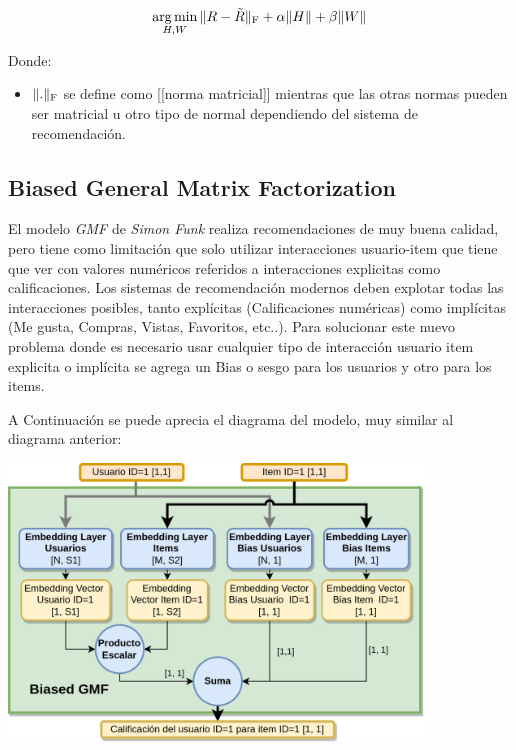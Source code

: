 \documentclass[11pt,a4paper,twoside]{thesis}
\begin{document}
\begin{equation*}
\underset{H, W}{\operatorname{arg\,min}}\, \|R - \tilde{R}\|_{\rm F} + \alpha\|H\| + \beta\|W\|
\end{equation*}
\begin{description}
\item[Donde:]
\end{description}
\begin{itemize}
\item $\|.\|_{\rm F}$ se define como [[norma matricial]] mientras que las otras normas pueden ser matricial u otro tipo de normal dependiendo del sistema de recomendación.
\end{itemize}

\subsection{Biased General Matrix Factorization}

El modelo \textit{GMF} de \textit{Simon Funk} realiza recomendaciones de muy buena calidad, pero tiene como limitación que solo utilizar interacciones usuario-item que tiene que ver con valores numéricos referidos a interacciones explicitas como calificaciones. Los sistemas de recomendación modernos deben explotar todas las interacciones posibles, tanto explícitas (Calificaciones numéricas) como implícitas (Me gusta, Compras, Vistas, Favoritos, etc..). Para solucionar este nuevo problema donde es necesario usar cualquier tipo de interacción usuario item explicita o implícita se agrega un Bias o sesgo para los usuarios y otro para los items.

A Continuación se puede aprecia el diagrama del modelo, muy similar al diagrama anterior:

\begin{center}
	\includegraphics[width=11cm]{./images/Biased-GMF.png}
\end{center}
\end{document}
